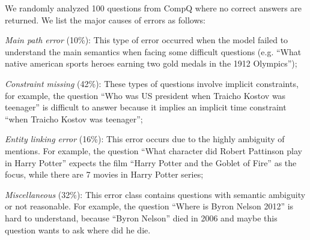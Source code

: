 We randomly analyzed 100 questions from CompQ
where no correct answers are returned.
We list the major causes of errors as follows:

\emph{Main path error} (10\%):
This type of error occurred when the model failed to understand the main semantics
when facing some difficult questions
(e.g. ``What native american sports heroes earning two gold medals in the 1912 Olympics''); %

\emph{Constraint missing} (42\%): These types of questions involve implicit constraints,
for example, the question ``Who was US president when Traicho Kostov was teenager''
is difficult to answer because it implies an implicit time constraint ``when Traicho Kostov was teenager''; %

\emph{Entity linking error} (16\%): This error occurs due to the highly ambiguity of mentions.
For example, the question ``What character did Robert Pattinson play in Harry Potter'' expects the film ``Harry Potter and the Goblet of Fire'' as the focus,
while there are 7 movies in Harry Potter series;  %

\emph{Miscellaneous} (32\%): This error class contains questions with semantic ambiguity or not reasonable.
For example, the question ``Where is Byron Nelson 2012'' is hard to understand,
because ``Byron Nelson'' died in 2006 and maybe this question wants to ask where did he die. %

